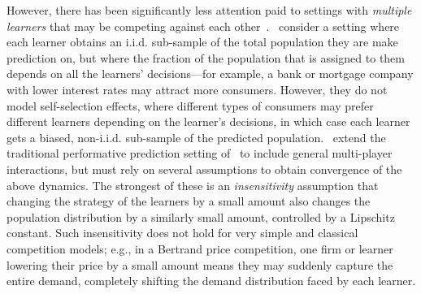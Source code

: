 However, there has been significantly less attention paid to settings with \emph{multiple learners} that may be competing against each other~\cite{dean2022multi,narang2023multiplayer}.~\cite{dean2022multi} consider a setting where each learner obtains an i.i.d. sub-sample of the total population they are make prediction on, but where the fraction of the population that is assigned to them depends on all the learners' decisions---for example, a bank or mortgage company with lower interest rates may attract more consumers. However, they do not model self-selection effects, where different types of consumers may prefer different learners depending on the learner's decisions, in which case each learner gets a biased, non-i.i.d. sub-sample of the predicted population.~\cite{narang2023multiplayer} extend the traditional performative prediction setting of~\cite{pmlr-v119-perdomo20a} to include general multi-player interactions, but must rely on several assumptions to obtain convergence of the above dynamics. The strongest of these is an \emph{insensitivity} assumption that changing the strategy of the learners by a small amount also changes the population distribution by a similarly small amount, controlled by a Lipschitz constant. Such insensitivity does not hold for very simple and classical competition models; e.g., in a Bertrand price competition, one firm or learner lowering their price by a small amount means they may suddenly capture the entire demand, completely shifting the demand distribution faced by each learner. 




